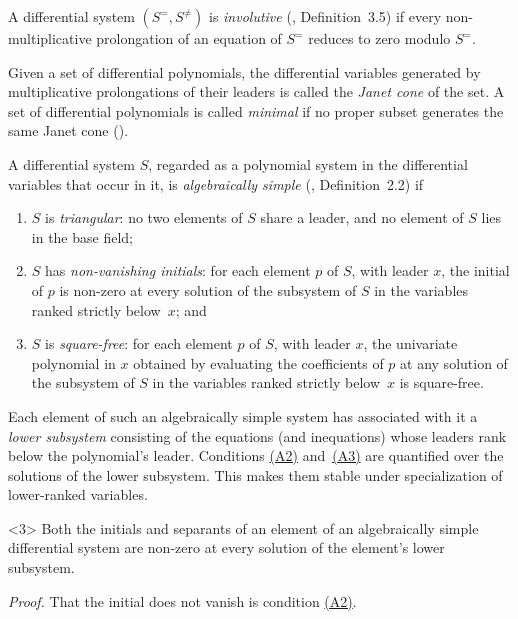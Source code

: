 \documentclass{article}
\theoremstyle{definition}
\theoremstyle{plain}
\newcommand{\condlabel}[1]{\hypertarget{cond:#1}{}}
\newcommand{\condref}[1]{\hyperlink{cond:#1}{(#1)}}
\begin{document}
\smallskip
A differential system $(S^=, S^{\ne})$
is {\it involutive} (\cite{ThomasDecomp}, Definition~3.5) if
every non-multiplicative prolongation of an equation of $S^=$ reduces to zero
modulo $S^=$.

\smallskip
Given a set of differential polynomials, the differential variables generated
by multiplicative prolongations of their leaders is called the {\it Janet cone}
of the set.
A set of differential polynomials is called {\it minimal}
if no proper subset generates the same Janet cone (\cite{ThomasDecomp}).

\smallskip
A differential system $S$,
regarded as a polynomial system in the differential variables that occur in
it, is {\it algebraically simple} (\cite{ThomasDecomp}, Definition~2.2) if

\begin{enumerate}
\item[\rm(A1)]\condlabel{A1} $S$ is {\it triangular}: no two elements of $S$ share a leader,
  and no element of $S$ lies in the base field;
\item[\rm(A2)]\condlabel{A2} $S$ has {\it non-vanishing initials}: for each element $p$ of
  $S$, with leader $x$, the initial of $p$ is non-zero at every solution of the
  subsystem of $S$ in the variables ranked strictly below~$x$; and
\item[\rm(A3)]\condlabel{A3} $S$ is {\it square-free}: for each element $p$ of $S$, with
  leader $x$, the univariate polynomial in $x$ obtained by evaluating the
  coefficients of $p$ at any solution of the subsystem of $S$ in the variables ranked strictly below~$x$
  is square-free.
\end{enumerate}

\noindent
Each element of such an algebraically simple system has
associated with it a {\it lower subsystem} consisting of the equations (and inequations)
whose leaders rank below the polynomial's leader.
Conditions \condref{A2} and~\condref{A3} are quantified over the solutions of the lower subsystem.
This makes them
stable under specialization of lower-ranked variables.

\begin{lemma}<3>
\label{lem:initials-and-separants-specialize}
Both the initials and separants of an element of an algebraically simple differential system are non-zero at every solution of the
element's lower subsystem.
\end{lemma}

{\it Proof.}
That the initial does not vanish is condition \condref{A2}.
\end{document}
